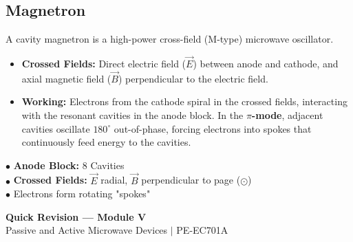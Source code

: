\documentclass[12pt,a4paper]{article}
\begin{document}
\subsection{Magnetron}
A cavity magnetron is a high-power cross-field (M-type) microwave oscillator.
\begin{itemize}[leftmargin=*, itemsep=3pt]
  \item \textbf{Crossed Fields:} Direct electric field ($\vec{E}$) between anode and cathode, and axial magnetic field ($\vec{B}$) perpendicular to the electric field.
  \item \textbf{Working:} Electrons from the cathode spiral in the crossed fields, interacting with the resonant cavities in the anode block. In the \textbf{$\pi$-mode}, adjacent cavities oscillate $180^\circ$ out-of-phase, forcing electrons into spokes that continuously feed energy to the cavities.
\end{itemize}

\begin{tcolorbox}[tikzbox, title={Cavity Magnetron Cross-Section}]
\begin{minipage}[c]{0.45\linewidth}
\centering
{}
\end{minipage}\hfill
\begin{minipage}[c]{0.5\linewidth}
\raggedright
$\bullet$ \textbf{Anode Block:} 8 Cavities\\[3pt]
$\bullet$ \textbf{Crossed Fields:} $\vec{E}$ radial, $\vec{B}$ perpendicular to page ($\odot$)\\[3pt]
$\bullet$ Electrons form rotating "spokes"
\end{minipage}
\end{tcolorbox}

\newpage
\begin{center}
  {\large\bfseries\color{myred} Quick Revision --- Module V}\\[3pt]
  {\small\color{mydark} Passive and Active Microwave Devices $|$ PE-EC701A}
\end{center}
\noindent{\color{myred}\rule{\linewidth}{1.2pt}}
\vspace{4pt}
\end{document}
